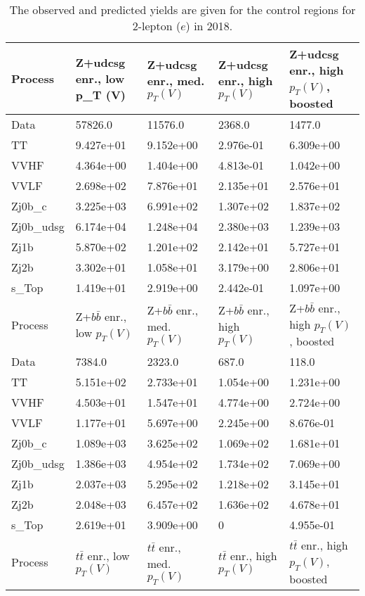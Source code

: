 \begin{table}
\centering
\caption[2018 2-lepton ($e$) control region yields]{
                  The observed and predicted yields are given for the
                  control regions for 2-lepton ($e$) in 2018.
                  }
{\footnotesize
\begin{tabularx}{\textwidth}{|X|X|X|X|X|}
\hline
Process & Z+udcsg enr., low p_{T} (V) & Z+udcsg enr., med. $p_{T}(V)$ & Z+udcsg enr., high $p_{T}(V)$ & Z+udcsg enr., high $p_{T}(V)$, boosted \\
\hline
Data & 57826.0 & 11576.0 & 2368.0 & 1477.0 \\
\hline
TT & 9.427e+01 & 9.152e+00 & 2.976e-01 & 6.309e+00 \\
VVHF & 4.364e+00 & 1.404e+00 & 4.813e-01 & 1.042e+00 \\
VVLF & 2.698e+02 & 7.876e+01 & 2.135e+01 & 2.576e+01 \\
Zj0b\_c & 3.225e+03 & 6.991e+02 & 1.307e+02 & 1.837e+02 \\
Zj0b\_udsg & 6.174e+04 & 1.248e+04 & 2.380e+03 & 1.239e+03 \\
Zj1b & 5.870e+02 & 1.201e+02 & 2.142e+01 & 5.727e+01 \\
Zj2b & 3.302e+01 & 1.058e+01 & 3.179e+00 & 2.806e+01 \\
s\_Top & 1.419e+01 & 2.919e+00 & 2.442e-01 & 1.097e+00 \\
\hline
\hline
Process & Z+$b\bar{b}$ enr., low $p_{T}(V)$ & Z+$b\bar{b}$ enr., med. $p_{T}(V)$ & Z+$b\bar{b}$ enr., high $p_{T}(V)$ & Z+$b\bar{b}$ enr., high $p_{T}(V)$, boosted \\
\hline
Data & 7384.0 & 2323.0 & 687.0 & 118.0 \\
\hline
TT & 5.151e+02 & 2.733e+01 & 1.054e+00 & 1.231e+00 \\
VVHF & 4.503e+01 & 1.547e+01 & 4.774e+00 & 2.724e+00 \\
VVLF & 1.177e+01 & 5.697e+00 & 2.245e+00 & 8.676e-01 \\
Zj0b\_c & 1.089e+03 & 3.625e+02 & 1.069e+02 & 1.681e+01 \\
Zj0b\_udsg & 1.386e+03 & 4.954e+02 & 1.734e+02 & 7.069e+00 \\
Zj1b & 2.037e+03 & 5.295e+02 & 1.218e+02 & 3.145e+01 \\
Zj2b & 2.048e+03 & 6.457e+02 & 1.636e+02 & 4.678e+01 \\
s\_Top & 2.619e+01 & 3.909e+00 & 0 & 4.955e-01 \\
\hline
\hline
Process & $t\bar{t}$ enr., low $p_{T}(V)$ & $t\bar{t}$ enr., med. $p_{T}(V)$ & $t\bar{t}$ enr., high $p_{T}(V)$ & $t\bar{t}$ enr., high $p_{T}(V)$, boosted \\

\end{tabularx}}
\end{table}
